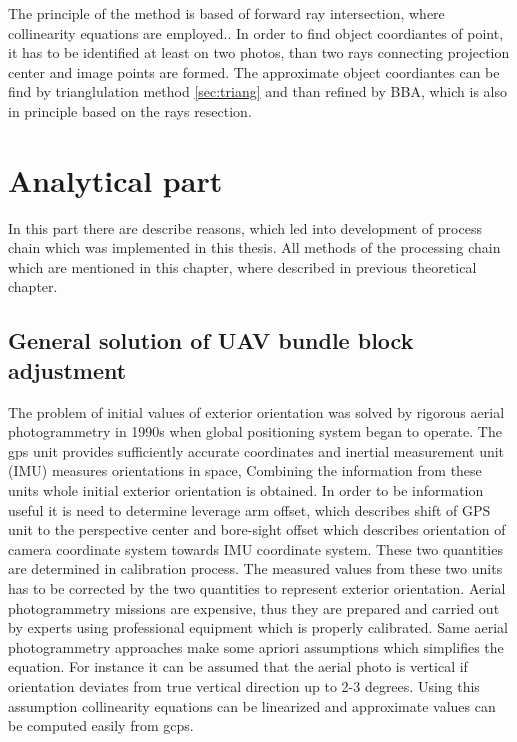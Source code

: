 \documentclass[a4paper,12pt]{report}
\begin{document}
The principle of the method is based of forward ray intersection, where collinearity equations are employed..
In order to find object coordiantes
of point, it has to be identified at least on two photos, than two rays connecting projection 
center and image points are formed. The approximate object coordiantes can be find by trianglulation 
method \ref{sec:triang} and than refined by BBA, which is also in principle based on the rays 
resection.
 

\chapter{Analytical part}

In this part there are describe reasons, which led into development of process chain which was implemented in 
this thesis. All methods of the processing chain which are mentioned in this chapter, where described in 
previous theoretical chapter.

\section{General solution of UAV bundle block adjustment}


The problem of initial values of exterior orientation was solved by  rigorous aerial photogrammetry in 1990s
when global positioning system began to operate. The gps unit provides sufficiently accurate coordinates and  
inertial measurement unit (IMU) measures orientations in space,  Combining the information from these units 
whole initial exterior orientation is obtained. In order to be information useful it is need to determine 
leverage arm offset, which describes shift of GPS unit to the perspective center and bore-sight offset
which describes orientation of camera coordinate system towards IMU coordinate system. These two
quantities are determined in calibration process. The measured values from these two units has to
be corrected by the two quantities to represent exterior orientation.
Aerial photogrammetry missions are expensive, thus they are prepared and carried out by experts using 
professional equipment which is properly calibrated.
Same aerial photogrammetry approaches make some apriori assumptions which simplifies the equation. 
For instance it can be assumed that the aerial photo is vertical if orientation deviates from true vertical
direction up to 2-3 degrees. Using this assumption collinearity equations can be linearized and 
approximate values can be computed easily from gcps.
\end{document}
